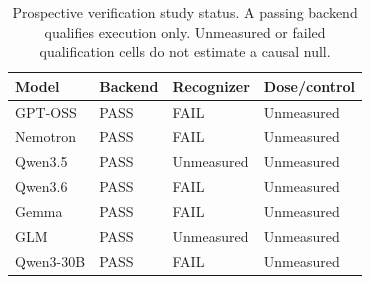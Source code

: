\begin{table}[t]
\centering
\begin{tabular}{llll}
\toprule
Model & Backend & Recognizer & Dose/control \\
\midrule
GPT-OSS & PASS & FAIL & Unmeasured \\
Nemotron & PASS & FAIL & Unmeasured \\
Qwen3.5 & PASS & Unmeasured & Unmeasured \\
Qwen3.6 & PASS & FAIL & Unmeasured \\
Gemma & PASS & FAIL & Unmeasured \\
GLM & PASS & Unmeasured & Unmeasured \\
Qwen3-30B & PASS & FAIL & Unmeasured \\
\bottomrule
\end{tabular}
\caption{Prospective verification study status. A passing backend qualifies execution only. Unmeasured or failed qualification cells do not estimate a causal null.}
\label{tab:verification-status}
\end{table}

